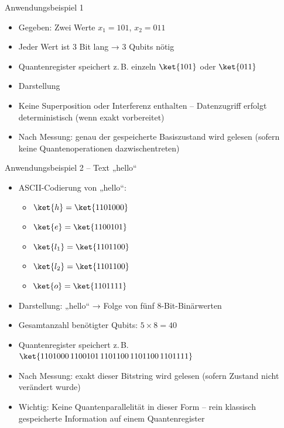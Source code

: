 Anwendungsbeispiel 1
\begin{itemize}
\item Gegeben: Zwei Werte $x_1 = 101$, $x_2 = 011$
\item Jeder Wert ist 3 Bit lang → 3 Qubits nötig
\item Quantenregister speichert z.\,B. einzeln $\ket{101}$ oder $ \ket{011}$
\item Darstellung 
\item Keine Superposition oder Interferenz enthalten – Datenzugriff erfolgt deterministisch (wenn exakt vorbereitet)
\item Nach Messung: genau der gespeicherte Basiszustand wird gelesen (sofern keine Quantenoperationen dazwischentreten)
\end{itemize}

Anwendungsbeispiel 2 – Text „hello“
\begin{itemize}
\item ASCII-Codierung von „hello“:
\begin{itemize}
    \item $\ket{h} = \ket{1101000}$
    \item $\ket{e} = \ket{1100101}$
    \item $\ket{l_1} = \ket{1101100}$
    \item $\ket{l_2} = \ket{1101100}$
    \item $\ket{o} = \ket{1101111}$
    
\end{itemize}
\item Darstellung: „hello“ → Folge von fünf 8-Bit-Binärwerten
\item Gesamtanzahl benötigter Qubits: $5 \times 8 = 40$
\item Quantenregister speichert z.\,B. $\ket{1101000\,1100101\,1101100\,1101100\,1101111}$
\item Nach Messung: exakt dieser Bitstring wird gelesen (sofern Zustand nicht verändert wurde)
\item Wichtig: Keine Quantenparallelität in dieser Form – rein klassisch gespeicherte Information auf einem Quantenregister
\end{itemize}
\cite{Quantum Data Encoding: A Comparative Analysis of Classical-to-Quantum Mapping Techniques and Their Impact on Machine Learning Accuracy}


